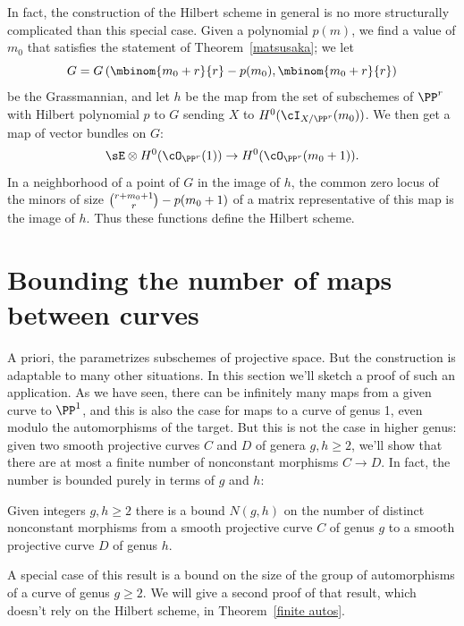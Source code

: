 In fact, the construction of the Hilbert scheme in general is no more
structurally complicated than this special case. Given a polynomial
$p(m)$, we find a value of $m_0$ that satisfies the statement of
Theorem~\ref{matsusaka}; we let
%
$$
G = G\left(\mbinom{m_0+r}{r} - p(m_0), \mbinom{m_0+r}{r} \right)
$$
be the Grassmannian, and let $h$ be the map from the set of
subschemes of $\PP^r$ with Hilbert polynomial $p$ to $G$ sending $X$
to $H^0(\cI_{X/\PP^r}(m_0))$. We then get a map of vector bundles  on $G$:
$$
\sE \otimes H^0(\cO_{\PP^r}(1)) \to H^0(\cO_{\PP^r}(m_0+1)).
$$
In a neighborhood of a point of $G$ in the image of $h$, the common zero
locus of the minors of size $\tbinom{r+m_0+1}{r} - p(m_0+1)$ of a matrix
representative of this map is the image of $h$. Thus these functions
define the Hilbert scheme.

\section{Bounding the number of maps between curves}
\label{maps between curves}

A priori, the
parametrizes subschemes of projective
%
%
space. But the construction is adaptable to many other situations. In
this section we'll sketch a proof of such an application. As we have seen,
there can be infinitely many maps from a given curve to $\PP^{1}$, and
this is also the case for maps to a curve of genus 1, even modulo the
automorphisms of the target. But this is not
the case in higher genus: given two smooth projective curves $C$ and $D$
of genera $g, h \geq 2$, we'll show that there are at most a finite number
of nonconstant morphisms $C \to D$. In fact, the number is bounded purely
in terms of $g$ and $h$:

\begin{theorem}
\label{bounded maps}
Given integers $g,h\geq 2$ there is a bound $N(g,h)$ on the number of
distinct nonconstant morphisms
from a smooth projective curve $C$ of genus $g$ to a smooth projective
curve $D$ of genus $h$.
\end{theorem}

A special case of this result is a bound on the size of the group of
automorphisms of a curve of genus $g\geq 2$. We will give a second
proof of that result, which doesn't rely on the Hilbert scheme, in
Theorem~\ref{finite autos}.

